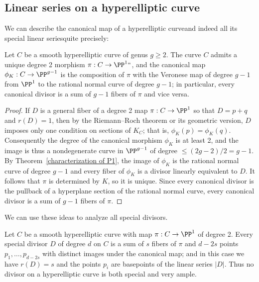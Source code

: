\subsection*{Linear series on a hyperelliptic curve}
We can describe the canonical map of a hyperelliptic curve\emdash and indeed all its special linear series\emdash quite precisely:

\begin{corollary}\label{canonical on hyperelliptic}
Let $C$ be a smooth hyperelliptic curve of genus $g\geq 2$. The curve $C$ admits a unique degree 2 morphism $\pi: C\to \PP^1` `$,
and the canonical map $\phi_K: C\to \PP^{g-1}$ is the composition of $\pi$ with the Veronese map of degree $g-1$ from
%
$\PP^1$ to the rational normal curve of degree $g-1$; in particular, every canonical divisor is a sum of $g-1$ fibers of $\pi$ and vice versa.
\unif
\end{corollary}

\begin{proof}
If $D$ is a general fiber of a degree 2 map $\pi:C\to \PP^1$ so that $D= p+q$ and $r(D) = 1$, then by the Riemann--Roch theorem or its geometric version, $D$ imposes only one condition on sections of $K_C$; that is, $\phi_K(p) = \phi_K(q)$. Consequently the degree of the canonical morphism $\phi_K$ is at least 2, and the image is thus a nondegenerate curve in $\PP^{g-1}$ of degree $\leq (2g-2)/2 = g-1$. By Theorem~\ref{characterization of P1}, the image of $\phi_K$ is the rational normal curve of degree $g-1$ and every fiber of $\phi_K$ is a divisor linearly equivalent to $D$. It follows that $\pi$ is determined by $K$, so it is unique. Since every canonical divisor is the pullback of a hyperplane section of the rational normal curve,
every canonical divisor is a sum of $g-1$ fibers of $\pi$.
\end{proof}

We can use these ideas to analyze all special divisors.
%
%

\begin{corollary}\label{special on hyperelliptic} Let $C$ be a smooth 
hyperelliptic curve
%
with map $\pi: C\to \PP^1$ of degree 2.
Every special divisor $D$ of degree $d$ on 
$C$ is a sum of $s$ fibers of $\pi$ and $d-2s$ points
$p_1,\dots,p_{d-2s}$ with distinct images under the canonical map; and
in this case we have $r(D) = s$ and the points $p_i$ are basepoints
of the linear series $|D|$.
Thus
no divisor on a hyperelliptic curve is both special and very ample.
\unif
\end{corollary}

